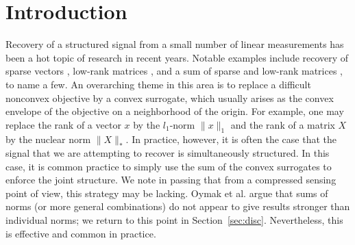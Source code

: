 \documentclass[smallextended,numbook]{svjour3}
\begin{document}
\section{Introduction}
Recovery of a structured signal from a small number of linear measurements has been a hot topic of research in recent years. Notable examples include recovery of sparse vectors \cite{CT, D, CMT}, low-rank matrices \cite{RFP, CR}, and a sum of sparse and low-rank matrices \cite{CLYW,CPW}, to name a few. An overarching theme in this area is to replace a difficult nonconvex objective by a convex surrogate, which usually arises as the convex envelope of the objective on a neighborhood of the origin. For example, one may replace the rank of a vector $x$ by the $l_1$-norm $\|x\|_1$ and the rank of a matrix $X$ by the nuclear norm $\|X\|_*$. In practice, however, it is often the case that the signal that we are attempting to recover is simultaneously structured. In this case, it is common practice to simply use the sum of the convex surrogates to enforce the joint structure. We note in passing that from a compressed sensing point of view, this strategy may be lacking. Oymak et al. \cite{Fazel_neg}  argue that sums of norms (or more general combinations) do not appear to give results stronger than individual norms; we return to
this point in Section~\ref{sec:disc}. Nevertheless, this  is effective and common in practice.
\end{document}
